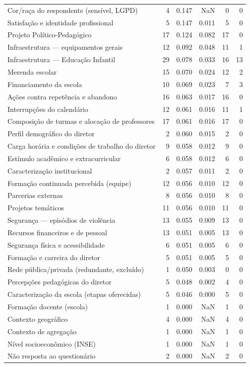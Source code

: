 \begin{tabular}{lrrrrr}
Cor/raça do respondente (sensível, LGPD) & 4 & 0.147 & NaN & 0 & 0 \\
Satisfação e identidade profissional & 5 & 0.147 & 0.011 & 5 & 0 \\
Projeto Político-Pedagógico & 17 & 0.124 & 0.082 & 17 & 0 \\
Infraestrutura — equipamentos gerais & 12 & 0.092 & 0.048 & 11 & 1 \\
Infraestrutura — Educação Infantil & 29 & 0.078 & 0.033 & 16 & 13 \\
Merenda escolar & 15 & 0.070 & 0.024 & 12 & 2 \\
Financiamento da escola & 10 & 0.069 & 0.023 & 7 & 3 \\
Ações contra repetência e abandono & 16 & 0.063 & 0.017 & 16 & 0 \\
Interrupções do calendário & 12 & 0.061 & 0.016 & 11 & 1 \\
Composição de turmas e alocação de professores & 17 & 0.061 & 0.016 & 17 & 0 \\
Perfil demográfico do diretor & 2 & 0.060 & 0.015 & 2 & 0 \\
Carga horária e condições de trabalho do diretor & 9 & 0.058 & 0.012 & 9 & 0 \\
Estímulo acadêmico e extracurricular & 6 & 0.058 & 0.012 & 6 & 0 \\
Caracterização institucional & 2 & 0.057 & 0.011 & 2 & 0 \\
Formação continuada percebida (equipe) & 12 & 0.056 & 0.010 & 12 & 0 \\
Parcerias externas & 8 & 0.056 & 0.010 & 8 & 0 \\
Projetos temáticos & 11 & 0.056 & 0.010 & 11 & 0 \\
Segurança — episódios de violência & 13 & 0.055 & 0.009 & 13 & 0 \\
Recursos financeiros e de pessoal & 13 & 0.051 & 0.005 & 13 & 0 \\
Segurança física e acessibilidade & 6 & 0.051 & 0.005 & 6 & 0 \\
Formação e carreira do diretor & 5 & 0.051 & 0.005 & 5 & 0 \\
Rede pública/privada (redundante, excluído) & 1 & 0.050 & 0.003 & 0 & 0 \\
Percepções pedagógicas do diretor & 5 & 0.048 & 0.002 & 4 & 0 \\
Caracterização da escola (etapas oferecidas) & 5 & 0.046 & 0.000 & 5 & 0 \\
Formação docente (escola) & 1 & 0.000 & NaN & 1 & 0 \\
Contexto geográfico & 4 & 0.000 & NaN & 4 & 0 \\
Contexto de agregação & 1 & 0.000 & NaN & 1 & 0 \\
Nível socioeconômico (INSE) & 1 & 0.000 & NaN & 1 & 0 \\
Não resposta ao questionário & 2 & 0.000 & NaN & 2 & 0 \\
\bottomrule
\end{tabular}
